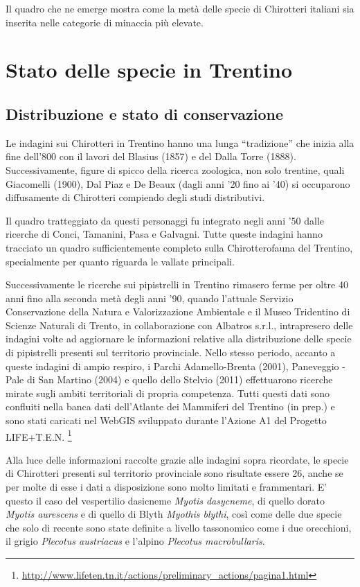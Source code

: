 \documentclass[10pt,twoside,openany,x11names,svgnames,italian,a5paper,dvipsnames,table]{memoir}
\begin{document}
\noindent Il quadro che ne emerge mostra come la metà delle specie di Chirotteri italiani sia inserita nelle categorie di minaccia più elevate.

\chapter{Stato delle specie in Trentino}
\section{Distribuzione e stato di conservazione}

Le indagini sui Chirotteri in Trentino hanno una lunga “tradizione” che inizia alla fine dell’800 con il lavori del Blasius (1857) e del Dalla Torre (1888). Successivamente, figure di spicco della ricerca zoologica, non solo trentine, quali Giacomelli (1900), Dal Piaz e De Beaux (dagli anni ’20 fino ai ’40) si occuparono diffusamente di Chirotteri compiendo degli studi distributivi.

Il quadro tratteggiato da questi personaggi fu integrato negli anni ’50 dalle ricerche di Conci, Tamanini, Pasa e Galvagni. Tutte queste indagini hanno tracciato un quadro sufficientemente completo sulla Chirotterofauna del Trentino, specialmente per quanto riguarda le vallate principali.

Successivamente le ricerche sui pipistrelli in Trentino rimasero ferme per oltre 40 anni fino alla seconda metà degli anni ’90, quando l’attuale Servizio Conservazione della Natura e Valorizzazione Ambientale e il Museo Tridentino di Scienze Naturali di Trento, in collaborazione con Albatros s.r.l., intrapresero delle indagini volte ad aggiornare le informazioni relative alla distribuzione delle specie di pipistrelli presenti sul territorio provinciale. Nello stesso periodo, accanto a queste indagini di ampio respiro, i Parchi Adamello-Brenta (2001), Paneveggio - Pale di San Martino (2004) e quello dello Stelvio (2011) effettuarono ricerche mirate sugli ambiti territoriali di propria competenza. Tutti questi dati sono confluiti nella banca dati dell'Atlante dei Mammiferi del Trentino (in prep.) e sono stati caricati nel WebGIS sviluppato durante l'Azione A1 del Progetto LIFE+T.E.N. \footnote{\url{http://www.lifeten.tn.it/actions/preliminary_actions/pagina1.html}}

Alla luce delle informazioni raccolte grazie alle indagini sopra ricordate, le specie di Chirotteri presenti sul territorio provinciale sono risultate essere 26, anche se per molte di esse i dati a disposizione sono molto limitati e frammentari. E' questo il caso del vespertilio dasicneme \emph{Myotis dasycneme}, di quello dorato \emph{Myotis aurescens} e di quello di Blyth \emph{Myothis blythi}, così come delle due specie che solo di recente sono state definite a livello tassonomico come i due orecchioni, il grigio \emph{Plecotus austriacus} e l'alpino \emph{Plecotus macrobullaris}.
\end{document}
